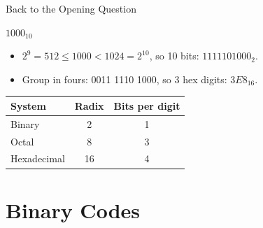 \documentclass[9pt,aspectratio=169,xcolor=table]{beamer}
\begin{document}
\begin{frame}{Back to the Opening Question}
  \begin{block}{$1000_{10}$}
    \begin{itemize}
      \item $2^9 = 512 \le 1000 < 1024 = 2^{10}$, so \alert{10 bits}: $1111101000_2$.
      \item Group in fours: 0011 1110 1000, so \alert{3 hex digits}: $3E8_{16}$.
    \end{itemize}
  \end{block}
  \vspace{3mm}
  \begin{center}
  \begin{tabular}{lcc}
    \toprule
    \textbf{System} & \textbf{Radix} & \textbf{Bits per digit} \\
    \midrule
    Binary & 2 & 1 \\
    Octal & 8 & 3 \\
    Hexadecimal & 16 & 4 \\
    \bottomrule
  \end{tabular}
  \end{center}
\end{frame}

\section{Binary Codes}
\end{document}
